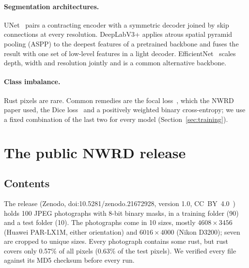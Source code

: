 \documentclass[11pt,a4paper]{article}
\begin{document}
\paragraph{Segmentation architectures.} UNet~\cite{ronneberger2015unet} pairs a contracting encoder
with a symmetric decoder joined by skip connections at every resolution. DeepLabV3+
\cite{chen2018deeplabv3plus} applies atrous spatial pyramid pooling (ASPP) to the deepest features
of a pretrained backbone and fuses the result with one set of low-level features in a light decoder.
EfficientNet~\cite{tan2019efficientnet} scales depth, width and resolution jointly and is a common
alternative backbone.

\paragraph{Class imbalance.} Rust pixels are rare. Common remedies are the focal
loss~\cite{lin2017focal}, which the NWRD paper used, the Dice loss~\cite{milletari2016vnet} and a
positively weighted binary cross-entropy; we use a fixed combination of the last two for every
model (Section~\ref{sec:training}).

\section{The public NWRD release}
\label{sec:data}


\subsection{Contents}
The release (Zenodo, doi:10.5281/zenodo.21672928, version 1.0, CC~BY~4.0~\cite{anwar2023zenodo})
holds 100 JPEG photographs with 8-bit binary masks, in a training folder (90) and a test folder
(10). The photographs come in 10 sizes, mostly $4608\times3456$ (Huawei PAR-LX1M, either
orientation) and $6016\times4000$ (Nikon D3200); seven are cropped to unique sizes. Every
photograph contains some rust, but rust covers only 0.57\% of all pixels (0.63\% of the test
pixels). We verified every file against its MD5 checksum before every run.
\end{document}
